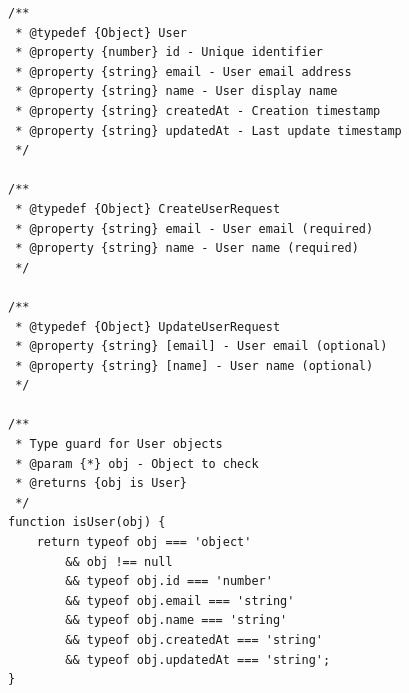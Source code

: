 \begin{verbatim}
/**
 * @typedef {Object} User
 * @property {number} id - Unique identifier
 * @property {string} email - User email address
 * @property {string} name - User display name
 * @property {string} createdAt - Creation timestamp
 * @property {string} updatedAt - Last update timestamp
 */

/**
 * @typedef {Object} CreateUserRequest
 * @property {string} email - User email (required)
 * @property {string} name - User name (required)
 */

/**
 * @typedef {Object} UpdateUserRequest
 * @property {string} [email] - User email (optional)
 * @property {string} [name] - User name (optional)
 */

/**
 * Type guard for User objects
 * @param {*} obj - Object to check
 * @returns {obj is User}
 */
function isUser(obj) {
    return typeof obj === 'object'
        && obj !== null
        && typeof obj.id === 'number'
        && typeof obj.email === 'string'
        && typeof obj.name === 'string'
        && typeof obj.createdAt === 'string'
        && typeof obj.updatedAt === 'string';
}
\end{verbatim}
